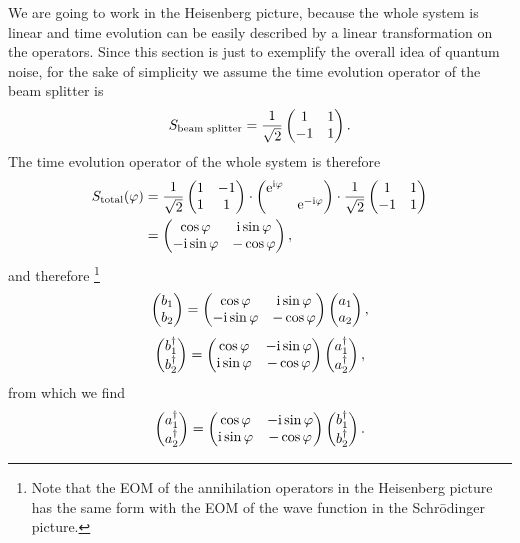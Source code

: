 \documentclass[hyperref, a4paper]{article}
\newcommand*{\ii}{\mathrm{i}}
\newcommand*{\ee}{\mathrm{e}}
\begin{document}
We are going to work in the Heisenberg picture,
because the whole system is linear 
and time evolution can be easily described by a linear transformation on the operators. 
Since this section is just to exemplify the overall idea of quantum noise,
for the sake of simplicity we assume the time evolution operator of the beam splitter is 
\begin{equation}
    S_{\text{beam splitter}} = \frac{1}{\sqrt{2}} \pmqty{ 1 & 1 \\ -1 & 1 } .
\end{equation}
The time evolution operator of the whole system is therefore
\begin{equation}
    \begin{aligned}
        S_\text{total}(\varphi) &= \frac{1}{\sqrt{2}} \pmqty{ 1 & -1 \\ 1 & 1 } \cdot \pmqty{\dmat{\ee^{\ii \varphi}, \ee^{- \ii \varphi}}} \cdot \frac{1}{\sqrt{2}} \pmqty{ 1 & 1 \\ -1 & 1 } \\
        &= \pmqty{ \cos \varphi & \ii \sin \varphi \\ - \ii \sin \varphi & - \cos \varphi },
    \end{aligned}
    \label{eq:total-matrix}
\end{equation} 
and therefore%
\footnote{
    Note that the EOM of the annihilation operators in the Heisenberg picture 
    has the same form with the EOM of the wave function in the Schr\={o}dinger picture.
} 
\begin{equation}
    \pmqty{b_1 \\ b_2} = \pmqty{ \cos \varphi & \ii \sin \varphi \\ - \ii \sin \varphi & - \cos \varphi } \pmqty{a_1 \\ a_2},
\end{equation}
\begin{equation}
    \pmqty{b_1^\dagger \\ b_2^\dagger} = \pmqty{ \cos \varphi & - \ii \sin \varphi \\ \ii \sin \varphi & - \cos \varphi } \pmqty{a_1^\dagger \\ a_2^\dagger},
    \label{eq:b-def-by-a}
\end{equation}
from which we find 
\begin{equation}
    \pmqty{a_1^\dagger \\ a_2^\dagger} = \pmqty{ \cos \varphi & - \ii \sin \varphi \\ \ii \sin \varphi & - \cos \varphi } \pmqty{b_1^\dagger \\ b_2^\dagger}.
\end{equation}
\end{document}
